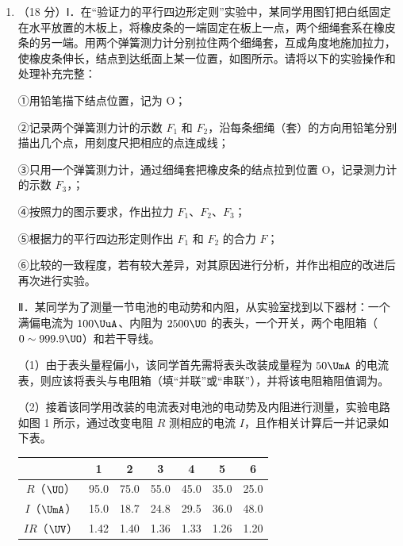 \documentclass[\gkver]{gaokaozhenti}
\begin{document}
\begin{enumerate}

\item
（18 分）Ⅰ．在“验证力的平行四边形定则”实验中，某同学用图钉把白纸固定在水平放置的木板上，将橡皮条的一端固定在板上一点，两个细绳套系在橡皮条的另一端。用两个弹簧测力计分别拉住两个细绳套，互成角度地施加拉力，使橡皮条伸长，结点到达纸面上某一位置，如图所示。请将以下的实验操作和处理补充完整：

①用铅笔描下结点位置，记为 O；

②记录两个弹簧测力计的示数 $F_{1}$ 和 $F_{2}$，沿每条细绳（套）的方向用铅笔分别描出几个点，用刻度尺把相应的点连成线；

③只用一个弹簧测力计，通过细绳套把橡皮条的结点拉到位置 O，记录测力计的示数 $F_{3}$，；

④按照力的图示要求，作出拉力 $F_{1}$、$F_{2}$、$F_{3}$；

⑤根据力的平行四边形定则作出 $F_{1}$ 和 $F_{2}$ 的合力 $F$；

⑥比较的一致程度，若有较大差异，对其原因进行分析，并作出相应的改进后再次进行实验。


Ⅱ．某同学为了测量一节电池的电动势和内阻，从实验室找到以下器材：一个满偏电流为 $100\UuA$、内阻为 $2500\UO$ 的表头，一个开关，两个电阻箱（$0\sim999.9\UO$）和若干导线。

（1）由于表头量程偏小，该同学首先需将表头改装成量程为 $50\UmA$ 的电流表，则应该将表头与电阻箱（填“并联”或“串联”），并将该电阻箱阻值调为\tkanswer[1.4cm]{$5.0\UO$}。

（2）接着该同学用改装的电流表对电池的电动势及内阻进行测量，实验电路如图 1 所示，通过改变电阻 $R$ 测相应的电流 $I$，且作相关计算后一并记录如下表。

\begin{center}
\begin{tabular}{|c|c|c|c|c|c|c|}
\hline
 & 1 & 2 & 3 & 4 & 5 & 6 \\
\hline
$R$（$\UO$） & 95.0 & 75.0 & 55.0 & 45.0 & 35.0 & 25.0 \\
\hline
$I$（$\UmA$） & 15.0 & 18.7 & 24.8 & 29.5 & 36.0 & 48.0 \\
\hline
$IR$（$\UV$） & 1.42 & 1.40 & 1.36 & 1.33 & 1.26 & 1.20 \\
\hline
\end{tabular}
\end{center}


\end{enumerate}
\end{document}
